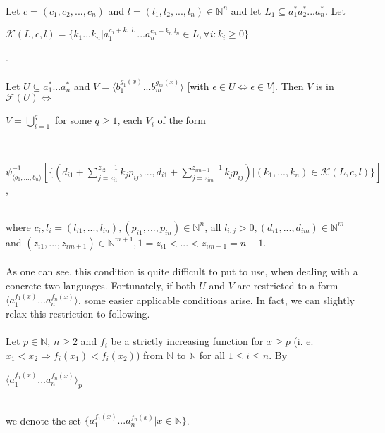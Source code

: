 \paragraph{}
\oznacenie Let $c = (c_{1}, c_{2}, ..., c_{n})$ and $l = (l_{1}, l_{2}, ..., l_{n}) \in \mathbb{N}^{n}$ and let $L_{1} \subseteq a_{1}^{*}a_{2}^{*}...a_{n}^{*}$. Let
\centerline{$\mathcal{K}(L, c, l) = \{ k_{1}...k_{n} | a_{1}^{c_{1}+k_{1}.l_{1}}...a_{n}^{c_{n}+k_{n}.l_{n}} \in L, \forall i: k_{i} \geq 0 \} $}.

\paragraph{}
\cveta Let $U \subseteq a_{1}^{*}...a_{n}^{*}$ and $V = \langle b_{1}^{g_{1}(x)}...b_{m}^{g_{m}(x)} \rangle $ [with $\epsilon \in U \Leftrightarrow \epsilon \in V$]. Then $V$ is in $\mathcal{F}(U) \Leftrightarrow $ \\
\centerline{$V = \bigcup_{i=1}^{q} $ for some $q \geq 1$, each $V_{i}$ of the form} \\
\centerline{$\psi_{\langle b_{1},...,b_{n}\rangle }^{-1} [ \{ ( d_{i1} + \sum_{j=z_{i1}}^{z_{i2} - 1} k_{j}p_{ij}, ..., d_{i1} + \sum_{j=z_{im}}^{z_{im+1} - 1} k_{j}p_{ij}) | (k_{1},...,k_{n}) \in \mathcal{K}(L, c, l) \} ]$, } \\
where $c_{i}, l_{i} = (l_{i1}, ..., l_{in}), (p_{i1},...,p_{in}) \in \mathbb{N}^{n}$, all $l_{i,j} > 0, (d_{i1}, ..., d_{im}) \in \mathbb{N}^{m}$ and $(z_{i1}, ..., z_{im+1}) \in \mathbb{N}^{m+1}, 1=z_{i1} < ... < z_{im+1} = n+1$.

\paragraph{}
As one can see, this condition is quite difficult to put to use, when dealing with a concrete two languages. Fortunately, if both $U$ and $V$ are restricted to a form $\langle a_{1}^{f_{1}(x)}...a_{n}^{f_{n}(x)} \rangle $, some easier applicable conditions arise. In fact, we can slightly relax this restriction to following.

\paragraph{}
\oznacenie Let $p \in \mathbb{N}$, $n \geq 2$ and $f_{i}$ be a strictly increasing function \underline{for $x \geq p$} (i. e. $x_{1} < x_{2} \Rightarrow f_{i}(x_{1}) < f_{i}(x_{2})$) from $\mathbb{N} $ to $\mathbb{N} $ for all $ 1 \leq i \leq n$. By \\
\centerline{$\langle a_{1}^{f_{1}(x)}...a_{n}^{f_{n}(x)} \rangle_{p} $} \\
we denote the set $\{ a_{1}^{f_{1}(x)}...a_{n}^{f_{n}(x)} | x \in \mathbb{N} \} $.

